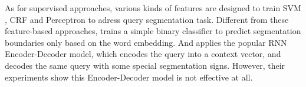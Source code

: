 As for supervised approaches, various kinds of features are designed to train SVM \cite{bergsma_learning_2007}, CRF \cite{yu_query_2009} and Perceptron \cite{du_perceptron-based_2014} to adress query segmentation task. Different from these feature-based approaches, \cite{kale_towards_2017} trains a simple binary classifier to predict segmentation boundaries only based on the word embedding. And \cite{lin_query_2017} applies the popular RNN Encoder-Decoder model, which encodes the query into a context vector, and decodes the same query with some special segmentation signs. However, their experiments show this Encoder-Decoder model is not effective at all.





